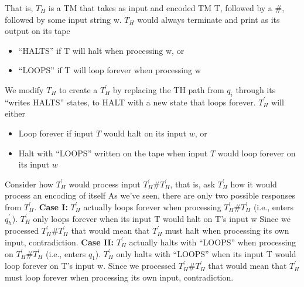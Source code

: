 \documentclass{report}
\begin{document}
\begin{itemize}
            \bigbreak \noindent 
            That is, $T_{H}$ is a TM that takes as input and encoded TM T, followed by a \#, followed by some input string w.
            \bigbreak \noindent 
            $T_{H}$ would always terminate and print as its output on its tape
            \begin{itemize}
                \item “HALTS” if T will halt when processing w, or
                \item “LOOPS” if T will loop forever when processing w
            \end{itemize}
            \bigbreak \noindent 
            \bigbreak \noindent 
            We modify $T_{H}$ to create a $T_{H}^{\prime} $ by replacing the TH path from $q_{i}$ through its “writes HALTS” states, to HALT with a new state that loops forever.
            \bigbreak \noindent 
            \bigbreak \noindent 
            $T_{H}^{\prime} $ will either
            \begin{itemize}
                \item Loop forever if input $T$ would halt on its input $w$, or
                \item Halt with “LOOPS” written on the tape when input $T$ would loop forever on its input $w$
            \end{itemize}
            \bigbreak \noindent 
            Consider how $T_{H}^{\prime}$ would process input $T_{H}^{\prime}\#T_{H}^{\prime}$, that is, ask $T_{H}^{\prime}$ how it would process an encoding of itself
            \bigbreak \noindent 
            As we’ve seen, there are only two possible responses from $T_{H}^{\prime} $.
            \bigbreak \noindent 
            \textbf{Case I:} $T_{H}^{\prime} $ actually loops forever when processing $T_{H}^{\prime}\#T_{H}^{\prime}$ (i.e., enters $q_{h}^{\prime} $). $T_{H}^{\prime} $ only loops forever when its input T would halt on T’s input w
            \bigbreak \noindent 
            Since we processed $T_{H}^{\prime}\#T_{H}^{\prime}$ that would mean that $T_{H}^{\prime}$ must halt when processing its own input, contradiction.
            \bigbreak \noindent 
            \textbf{Case II:} $T_{H}^{\prime}$ actually halts with “LOOPS” when processing on $T_{H}^{\prime}\#T_{H}^{\prime} $ (i.e., enters $q_{1}$). 
            $T_{H}^{\prime}$ only halts with “LOOPS” when its input T would loop forever on T’s input w.
            \bigbreak \noindent 
            Since we processed $T_{H}^{\prime}\#T_{H}^{\prime}$ that would mean that $T_{H}^{\prime} $ must loop forever when processing its own input, contradiction.

\end{itemize}
\end{document}
